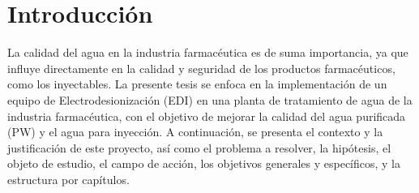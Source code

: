 \chapter*{Introducción}
La calidad del agua en la industria farmacéutica es de suma importancia, ya que influye directamente en la calidad y seguridad de los productos farmacéuticos, como los inyectables. La presente tesis se enfoca en la implementación de un equipo de Electrodesionización (EDI) en una planta de tratamiento de agua de la industria farmacéutica, con el objetivo de mejorar la calidad del agua purificada (PW) y el agua para inyección. A continuación, se presenta el contexto y la justificación de este proyecto, así como el problema a resolver, la hipótesis, el objeto de estudio, el campo de acción, los objetivos generales y específicos, y la estructura por capítulos.\\











